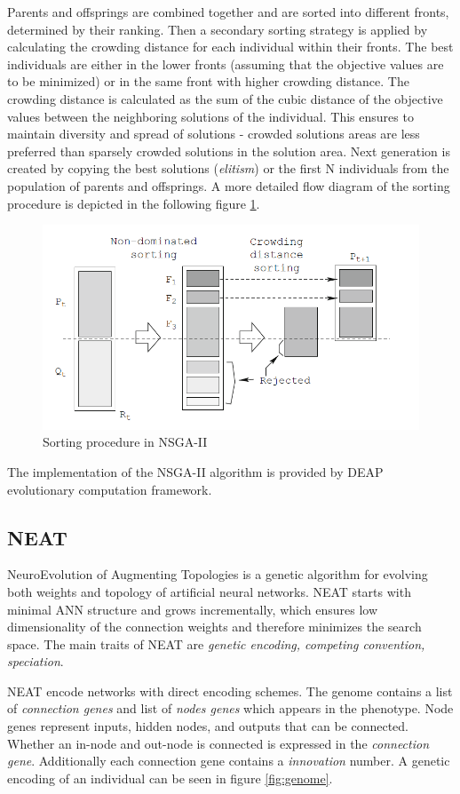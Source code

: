 \documentclass[format=acmsmall, review=false, screen=true]{acmart}
\begin{document}
Parents and offsprings are combined together and are sorted into different fronts, determined by their ranking. Then a secondary sorting strategy is applied by calculating the crowding distance for each individual within their fronts. The best individuals are either in the lower fronts (assuming that the objective values are to be minimized) or in the same front with higher crowding distance. The crowding distance is calculated as the sum of the cubic distance of the objective values between the neighboring solutions of the individual. This ensures to maintain diversity and spread of solutions - crowded solutions areas are less preferred than sparsely crowded solutions in the solution area. Next generation is created by copying the best solutions (\emph{elitism}) or the first N individuals from the population of parents and offsprings. A more detailed flow diagram of the sorting procedure is depicted in the following figure \ref{fig:nsga}.

\begin{figure}[H]
  \includegraphics[width=0.66\linewidth]{img/nsga.PNG}
  \caption{\label{fig:nsga}Sorting procedure in NSGA-II}
\end{figure}

The implementation of the NSGA-II algorithm is provided by DEAP \cite{fortin2012deap} evolutionary computation framework.

\subsection{NEAT}

NeuroEvolution of Augmenting Topologies \cite{stanley2002evolving} is a genetic algorithm for evolving both weights and topology of artificial neural networks. NEAT starts with minimal ANN structure and grows incrementally, which ensures low dimensionality of the connection weights and therefore minimizes the search space. The main traits of NEAT are \emph{genetic encoding, competing convention, speciation}.

NEAT encode networks with direct encoding schemes. The genome contains a list of \emph{connection genes} and list of \emph{nodes genes} which appears in the phenotype. Node genes represent inputs, hidden nodes, and outputs that can be connected. Whether an in-node and out-node is connected is expressed in the \emph{connection gene}. Additionally each connection gene contains a \emph{innovation} number. A genetic encoding of an individual can be seen in figure \ref{fig:genome}.
\end{document}
